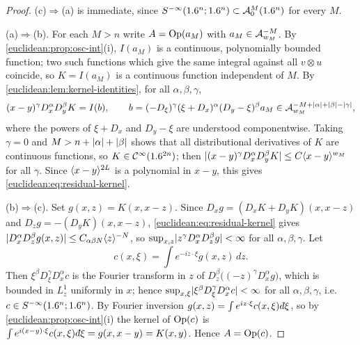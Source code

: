 \begin{proof}
  (c)$\Rightarrow$(a) is immediate, since
  $S^{-\infty}(1.6^n;1.6^n)\subset\mathcal{A}^{M}_{0}(1.6^n)$ for every $M$.

  (a)$\Rightarrow$(b). For each $M>n$ write $A=\operatorname{Op}(a_M)$ with
  $a_M\in\mathcal{A}^{-M}_{w_M}$. By \cref{euclidean:prop:osc-int}(i), $I(a_M)$ is a
  continuous, polynomially bounded function; two such functions which give
  the same integral against all $v\otimes u$ coincide, so $K=I(a_M)$ is a
  continuous function independent of $M$. By
  \cref{euclidean:lem:kernel-identities}, for all $\alpha,\beta,\gamma$,
  \begin{equation*}
    (x-y)^\gamma D^\alpha_xD^\beta_yK=I(b),\qquad
    b=(-D_\xi)^\gamma(\xi+D_x)^\alpha(D_y-\xi)^\beta a_M
    \in\mathcal{A}^{-M+\lvert \alpha\rvert+\lvert \beta\rvert-\lvert \gamma\rvert}_{w_M},
  \end{equation*}
  where the powers of $\xi+D_x$ and $D_y-\xi$ are understood componentwise.
  Taking $\gamma=0$ and $M>n+\lvert \alpha\rvert+\lvert \beta\rvert$ shows that all
  distributional derivatives of $K$ are continuous functions, so
  $K\in\mathcal{C}^\infty(1.6^{2n})$; then $\lvert (x-y)^\gamma D^\alpha_xD^\beta_yK\rvert\le C\langle x-y\rangle^{w_M}$
  for all $\gamma$. Since $\langle x-y\rangle^{2L}$ is a polynomial in $x-y$, this
  gives \eqref{euclidean:eq:residual-kernel}.

  (b)$\Rightarrow$(c). Set $g(x,z)=K(x,x-z)$. Since
  $D_xg=(D_xK+D_yK)(x,x-z)$ and $D_zg=-(D_yK)(x,x-z)$,
  \eqref{euclidean:eq:residual-kernel} gives
  $\lvert D^\alpha_xD^\beta_zg(x,z)\rvert\le C_{\alpha\beta N}\langle z\rangle^{-N}$, so
  $\sup_{x,z}\lvert z^\gamma D^\alpha_xD^\beta_zg\rvert<\infty$ for all
  $\alpha,\beta,\gamma$. Let
  \begin{equation*}
    c(x,\xi)=\int e^{-iz\cdot\xi}g(x,z)\,dz.
  \end{equation*}
  Then $\xi^\beta D^\gamma_\xi D^\alpha_xc$ is the Fourier transform in $z$ of
  $D^\beta_z\bigl((-z)^\gamma D^\alpha_xg\bigr)$, which is bounded in $L^1_z$
  uniformly in $x$; hence $\sup_{x,\xi}\lvert \xi^\beta D^\gamma_\xi D^\alpha_x c\rvert<\infty$
  for all $\alpha,\beta,\gamma$, i.e.\ $c\in S^{-\infty}(1.6^n;1.6^n)$. By
  Fourier inversion $g(x,z)=\int e^{iz\cdot\xi}c(x,\xi)\,\dbar\xi$, so by
  \cref{euclidean:prop:osc-int}(i) the kernel of $\operatorname{Op}(c)$ is
  $\int e^{i(x-y)\cdot\xi}c(x,\xi)\,\dbar\xi=g(x,x-y)=K(x,y)$. Hence
  $A=\operatorname{Op}(c)$.
\end{proof}

